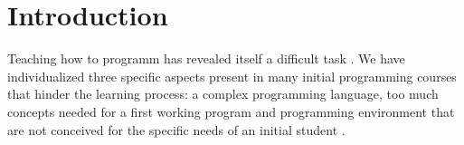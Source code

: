\section{Introduction}
\label{sec:intro}




Teaching how to programm has revealed itself a difficult task \cite{dijkstra_89a, jenkins2002difficulty}.
We have individualized three specific aspects present in many initial programming courses that hinder  the learning process: 
a complex programming language,
too much concepts needed for a first working program and
programming environment that are not conceived for the specific needs of an initial student \cite{singh2012}.



